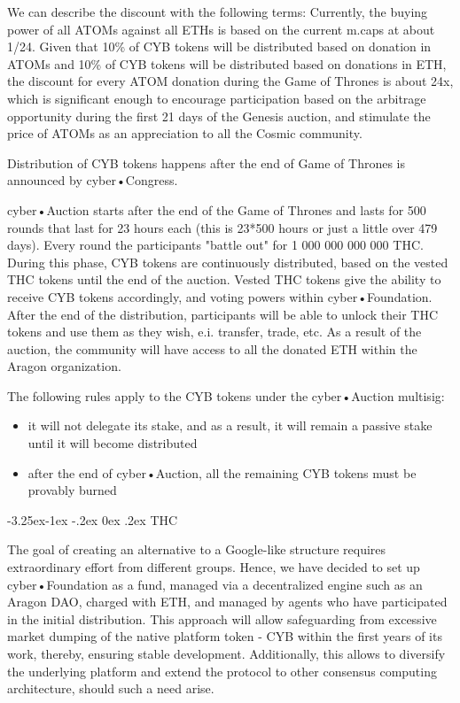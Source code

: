 \documentclass[8pt,oneside]{amsart}
\makeatletter
\renewcommand\subsection{\@startsection{subsection}{2}{\z@}%
                                     {-3.25ex\@plus -1ex \@minus -.2ex}%
                                     {0ex \@plus .2ex}%
                                     {\play\Large}}%
\newcommand{\titleSection}[1]{\subsection{#1}}
\makeatother
\begin{document}
\begin{Abstract}
We can describe the discount with the following terms: Currently, the buying power of all ATOMs against all ETHs is based on the current m.caps at about 1/24. Given that 10\% of CYB tokens will be distributed based on donation in ATOMs and 10\% of CYB tokens will be distributed based on donations in ETH, the discount for every ATOM donation during the Game of Thrones is about 24x, which is significant enough to encourage participation based on the arbitrage opportunity during the first 21 days of the Genesis auction, and stimulate the price of ATOMs as an appreciation to all the Cosmic community.

Distribution of CYB tokens happens after the end of Game of Thrones is announced by cyber•Congress.

cyber•Auction starts after the end of the Game of Thrones and lasts for 500 rounds that last for 23 hours each (this is 23*500 hours or just a little over 479 days). Every round the participants "battle out" for 1 000 000 000 000 THC. During this phase, CYB tokens are continuously distributed, based on the vested THC tokens until the end of the auction. Vested THC tokens give the ability to receive CYB tokens accordingly, and voting powers within cyber•Foundation. After the end of the distribution, participants will be able to unlock their THC tokens and use them as they wish, e.i. transfer, trade, etc. As a result of the auction, the community will have access to all the donated ETH within the Aragon organization.

The following rules apply to the CYB tokens under the cyber•Auction multisig:

\begin{itemize}
\item it will not delegate its stake, and as a result, it will remain a passive stake until it will become distributed
\item after the end of cyber•Auction, all the remaining CYB tokens must be provably burned
\end{itemize}

\titleSection{THC}\label{THC}

The goal of creating an alternative to a Google-like structure requires extraordinary effort from different groups. Hence, we have decided to set up cyber•Foundation as a fund, managed via a decentralized engine such as an Aragon DAO, charged with ETH, and managed by agents who have participated in the initial distribution. This approach will allow safeguarding from excessive market dumping of the native platform token - CYB within the first years of its work, thereby, ensuring stable development. Additionally, this allows to diversify the underlying platform and extend the protocol to other consensus computing architecture, should such a need arise.


\end{Abstract}
\end{document}

